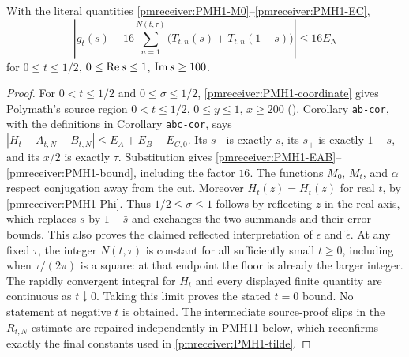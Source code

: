 \begin{pmreceivertheorem}
\label{pmreceiver:PMH1}
With the literal quantities \eqref{pmreceiver:PMH1-M0}--\eqref{pmreceiver:PMH1-EC},
\begin{equation}\label{pmreceiver:PMH1-bound}
 \left|g_t(s)-16\sum_{n=1}^{N(t,\tau)}
       \bigl(T_{t,n}(s)+T_{t,n}(1-s)\bigr)\right|\le16E_N
\end{equation}
for $0\le t\le1/2$, $0\le\operatorname{Re} s\le1$, $\operatorname{Im} s\ge100$.
\end{pmreceivertheorem}
\begin{proof}
For $0<t\le1/2$ and $0\le\sigma\le1/2$,
\eqref{pmreceiver:PMH1-coordinate} gives Polymath's source region
$0<t\le1/2$, $0\le y\le1$, $x\ge200$ ().
Corollary \texttt{ab-cor}, with the definitions in
Corollary \texttt{abc-cor}, says
$|H_t-A_{t,N}-B_{t,N}|\le E_A+E_B+E_{C,0}$.
Its $s_-$ is exactly $s$, its $s_+$ is exactly $1-s$, and its
$x/2$ is exactly $\tau$. Substitution gives
\eqref{pmreceiver:PMH1-EAB}--\eqref{pmreceiver:PMH1-bound}, including the factor $16$.
The functions $M_0$, $M_t$, and $\alpha$ respect conjugation away
from the cut. Moreover $H_t(\bar z)=\overline{H_t(z)}$ for real $t$,
by \eqref{pmreceiver:PMH1-Phi}. Thus $1/2\le\sigma\le1$ follows by reflecting
$z$ in the real axis, which replaces $s$ by $1-\bar s$ and exchanges
the two summands and their error bounds. This also proves the claimed
reflected interpretation of $\epsilon$ and $\widetilde\epsilon$.
At any fixed $\tau$, the integer $N(t,\tau)$ is constant for all
sufficiently small $t\ge0$, including when $\tau/(2\pi)$ is a square:
at that endpoint the floor is already the larger integer.
The rapidly convergent integral for $H_t$ and every displayed finite
quantity are continuous as $t\downarrow0$. Taking this limit proves
the stated $t=0$ bound. No statement at negative $t$ is obtained.
The intermediate source-proof slips in the $R_{t,N}$ estimate are
repaired independently in PMH11 below, which reconfirms exactly
the final constants used in \eqref{pmreceiver:PMH1-tilde}.
\end{proof}

